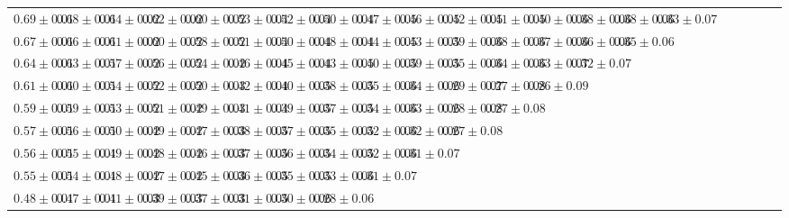 \begin{table}[ht]
{{\begin{adjustbox}{width=\textwidth}
\begin{tabular}{ccccccccccccccccccccccc}
$0.69 \pm 0.01$ & $0.68 \pm 0.01$ & $0.64 \pm 0.02$ & $0.62 \pm 0.02$ & $0.60 \pm 0.02$ & $0.53 \pm 0.04$ & $0.52 \pm 0.04$ & $0.50 \pm 0.04$ & $0.47 \pm 0.05$ & $0.46 \pm 0.05$ & $0.42 \pm 0.05$ & $0.41 \pm 0.05$ & $0.40 \pm 0.06$ & $0.38 \pm 0.06$ & $0.38 \pm 0.06$ & $0.33 \pm 0.07$ &  &  &  &  &  &  &  \\
$0.67 \pm 0.01$ & $0.66 \pm 0.01$ & $0.61 \pm 0.02$ & $0.60 \pm 0.02$ & $0.58 \pm 0.02$ & $0.51 \pm 0.04$ & $0.50 \pm 0.04$ & $0.48 \pm 0.04$ & $0.44 \pm 0.05$ & $0.43 \pm 0.05$ & $0.39 \pm 0.06$ & $0.38 \pm 0.06$ & $0.37 \pm 0.06$ & $0.36 \pm 0.06$ & $0.35 \pm 0.06$ &  &  &  &  &  &  &  &  \\
$0.64 \pm 0.01$ & $0.63 \pm 0.01$ & $0.57 \pm 0.02$ & $0.56 \pm 0.02$ & $0.54 \pm 0.02$ & $0.46 \pm 0.04$ & $0.45 \pm 0.04$ & $0.43 \pm 0.05$ & $0.40 \pm 0.05$ & $0.39 \pm 0.05$ & $0.35 \pm 0.06$ & $0.34 \pm 0.06$ & $0.33 \pm 0.07$ & $0.32 \pm 0.07$ &  &  &  &  &  &  &  &  &  \\
$0.61 \pm 0.01$ & $0.60 \pm 0.01$ & $0.54 \pm 0.02$ & $0.52 \pm 0.02$ & $0.50 \pm 0.03$ & $0.42 \pm 0.04$ & $0.40 \pm 0.05$ & $0.38 \pm 0.05$ & $0.35 \pm 0.06$ & $0.34 \pm 0.06$ & $0.29 \pm 0.07$ & $0.27 \pm 0.08$ & $0.26 \pm 0.09$ &  &  &  &  &  &  &  &  &  &  \\
$0.59 \pm 0.01$ & $0.59 \pm 0.01$ & $0.53 \pm 0.02$ & $0.51 \pm 0.02$ & $0.49 \pm 0.03$ & $0.41 \pm 0.04$ & $0.39 \pm 0.05$ & $0.37 \pm 0.05$ & $0.34 \pm 0.06$ & $0.33 \pm 0.06$ & $0.28 \pm 0.08$ & $0.27 \pm 0.08$ &  &  &  &  &  &  &  &  &  &  &  \\
$0.57 \pm 0.01$ & $0.56 \pm 0.01$ & $0.50 \pm 0.02$ & $0.49 \pm 0.02$ & $0.47 \pm 0.03$ & $0.38 \pm 0.05$ & $0.37 \pm 0.05$ & $0.35 \pm 0.05$ & $0.32 \pm 0.06$ & $0.32 \pm 0.06$ & $0.27 \pm 0.08$ &  &  &  &  &  &  &  &  &  &  &  &  \\
$0.56 \pm 0.01$ & $0.55 \pm 0.01$ & $0.49 \pm 0.02$ & $0.48 \pm 0.02$ & $0.46 \pm 0.03$ & $0.37 \pm 0.05$ & $0.36 \pm 0.05$ & $0.34 \pm 0.05$ & $0.32 \pm 0.06$ & $0.31 \pm 0.07$ &  &  &  &  &  &  &  &  &  &  &  &  &  \\
$0.55 \pm 0.01$ & $0.54 \pm 0.01$ & $0.48 \pm 0.02$ & $0.47 \pm 0.02$ & $0.45 \pm 0.03$ & $0.36 \pm 0.05$ & $0.35 \pm 0.05$ & $0.33 \pm 0.06$ & $0.31 \pm 0.07$ &  &  &  &  &  &  &  &  &  &  &  &  &  &  \\
$0.48 \pm 0.01$ & $0.47 \pm 0.01$ & $0.41 \pm 0.03$ & $0.39 \pm 0.03$ & $0.37 \pm 0.03$ & $0.31 \pm 0.05$ & $0.30 \pm 0.06$ & $0.28 \pm 0.06$ &  &  &  &  &  &  &  &  &  &  &  &  &  &  &  \\

\end{tabular}
\end{adjustbox}}}
\end{table}
